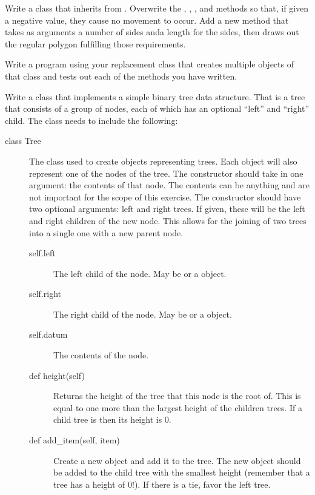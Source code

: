 \documentclass[11pt]{cselabheader}
\begin{document}
\begin{ex}[myturtle.py]
    Write a class that inherits from . Overwrite
    the , , ,
    and  methods so that, if given a negative value, they
    cause no movement to occur. Add a new method 
    that takes as arguments a number of sides anda length for the sides, then
    draws out the regular polygon fulfilling those requirements.

    Write a program using your replacement  class that
    creates multiple objects of that class and tests out each of the methods
    you have written.
\end{ex}

\begin{ex}[tree.py]
    Write a class that implements a simple binary tree data structure. That is a
    tree that consists of a group of nodes, each of which has an optional
    ``left'' and ``right'' child. The class needs to include the following:
    \begin{description}
    \item[class Tree] The class used to create objects representing trees. Each
        object will also represent one of the nodes of the tree. The constructor
        should take in one argument: the contents of that node. The contents can
        be anything and are not important for the scope of this exercise. The
        constructor should have two optional arguments: left and right trees. If
        given, these will be the left and right children of the new node. This
        allows for the joining of two trees into a single one with a new parent
        node.
        \begin{description}
        \item[self.left] The left child of the node. May be
             or a  object.
        \item[self.right] The right child of the node. May be
             or a  object.
        \item[self.datum] The contents of the node.
        \item[def height(self)] Returns the height of the tree that this node
            is the root of. This is equal to one more than the largest height
            of the children trees. If a child tree is  then
            its height is 0.
        \item[def add_item(self, item)] Create a new  object
            and add it to the tree. The new object should be added to the child
            tree with the smallest height (remember that a 
            tree has a height of 0!). If there is a tie, favor the left tree.
        \end{description}
    \end{description}
\end{ex}
\end{document}
